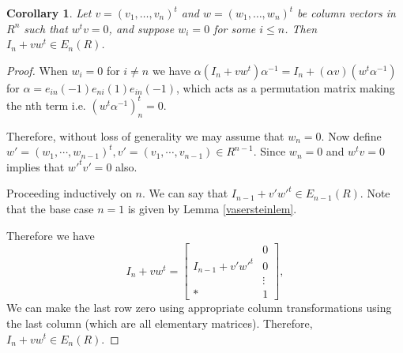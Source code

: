 \documentclass[12pt]{report}
\numberwithin{equation}{section}
\newcounter{dummy} \numberwithin{dummy}{section}
\newtheorem{corollary}[dummy]{Corollary}
\begin{document}
		\begin{corollary}\label{corofvaserstein}
		Let $v = (v_1,\ldots,v_n)^t$ and $w = (w_1,\ldots,w_n)^t$ be column vectors in $R^n$ such that $w^tv = 0$, and suppose $w_i = 0$ for some $i \leq n$. Then $I_n + vw^t \in E_n(R)$.
		\end{corollary}
		\begin{proof}
			When $w_i =0$ for $i \neq n $ we have $\alpha(I_n+vw^t)\alpha^{-1}=I_n+(\alpha v)(w^t\alpha^{-1})$for $\alpha=e_{in}(-1)e_{ni}(1)e_{in}(-1)$, which acts as a permutation matrix making the nth term i.e. $(w^t \alpha^{-1})^t_n=0$.
			
			Therefore, without loss of generality we may assume that $w_n=0$. Now define $w'=(w_1,\cdots, w_{n-1})^t, v'=(v_1, \cdots, v_{n-1}) \in R^{n-1}$. Since $w_n=0$ and $w^tv=0 $ implies that $w'^tv'=0$ also. 
			
			Proceeding inductively on $n$. We can say that $I_{n-1}+v'w'^t \in E_{n-1}(R)$. Note that the base case $n=1$ is given by Lemma \ref{vasersteinlem}.
			
			Therefore we have  \[
			I_n + v w^t = \begin{bmatrix}  & 0 \\ 
			I_{n-1} + v' w'^t	& 0\\
				 & \vdots \\ \hline
				* & 1 \end{bmatrix},
			\]
			We can make the last row zero using appropriate column transformations using the last column (which are all elementary matrices). Therefore, $I_n +vw^t \in E_n(R).$
		\end{proof}
		
\end{document}
